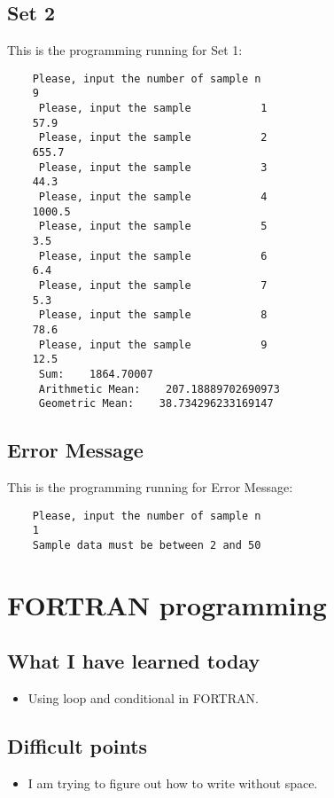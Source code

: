 \documentclass[11pt]{article}
\begin{document}
\subsection{Set 2}
This is the programming running for Set 1:

\begin{verbatim}
    Please, input the number of sample n
    9
     Please, input the sample           1
    57.9
     Please, input the sample           2
    655.7
     Please, input the sample           3
    44.3
     Please, input the sample           4
    1000.5
     Please, input the sample           5
    3.5
     Please, input the sample           6
    6.4
     Please, input the sample           7
    5.3
     Please, input the sample           8
    78.6
     Please, input the sample           9
    12.5
     Sum:    1864.70007    
     Arithmetic Mean:    207.18889702690973     
     Geometric Mean:    38.734296233169147                    
\end{verbatim}  

\subsection{Error Message}
This is the programming running for Error Message:

\begin{verbatim}
    Please, input the number of sample n
    1
    Sample data must be between 2 and 50           
\end{verbatim} 

\section{FORTRAN programming}
\subsection{What I have learned today}
\begin{itemize}
    \item Using loop and conditional in FORTRAN.
\end{itemize}
\subsection{Difficult points}
\begin{itemize}
    \item I am trying to figure out how to write without space. 
\end{itemize}
\end{document}
